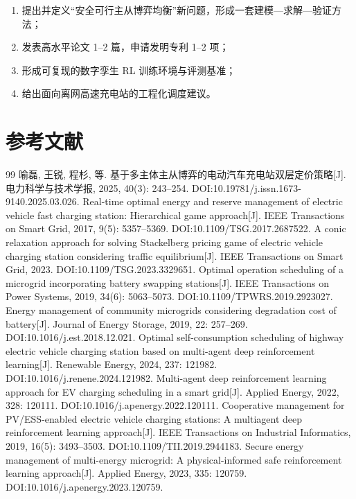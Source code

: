 \documentclass[UTF8,a4paper,11pt]{ctexart}
\begin{document}
\begin{enumerate}
  \item 提出并定义“安全可行主从博弈均衡”新问题，形成一套建模—求解—验证方法；
  \item 发表高水平论文 1--2 篇，申请发明专利 1--2 项；
  \item 形成可复现的数字孪生 RL 训练环境与评测基准；
  \item 给出面向离网高速充电站的工程化调度建议。
\end{enumerate}

\section*{参考文献}
\begin{thebibliography}{99}\small
{} 喻磊, 王锐, 程杉, 等. 基于多主体主从博弈的电动汽车充电站双层定价策略[J]. 电力科学与技术学报, 2025, 40(3): 243--254. DOI:10.19781/j.issn.1673-9140.2025.03.026.
 Real-time optimal energy and reserve management of electric vehicle fast charging station: Hierarchical game approach[J]. IEEE Transactions on Smart Grid, 2017, 9(5): 5357--5369. DOI:10.1109/TSG.2017.2687522.
 A conic relaxation approach for solving Stackelberg pricing game of electric vehicle charging station considering traffic equilibrium[J]. IEEE Transactions on Smart Grid, 2023. DOI:10.1109/TSG.2023.3329651.
 Optimal operation scheduling of a microgrid incorporating battery swapping stations[J]. IEEE Transactions on Power Systems, 2019, 34(6): 5063--5073. DOI:10.1109/TPWRS.2019.2923027.
 Energy management of community microgrids considering degradation cost of battery[J]. Journal of Energy Storage, 2019, 22: 257--269. DOI:10.1016/j.est.2018.12.021.
 Optimal self-consumption scheduling of highway electric vehicle charging station based on multi-agent deep reinforcement learning[J]. Renewable Energy, 2024, 237: 121982. DOI:10.1016/j.renene.2024.121982.
 Multi-agent deep reinforcement learning approach for EV charging scheduling in a smart grid[J]. Applied Energy, 2022, 328: 120111. DOI:10.1016/j.apenergy.2022.120111.
 Cooperative management for PV/ESS-enabled electric vehicle charging stations: A multiagent deep reinforcement learning approach[J]. IEEE Transactions on Industrial Informatics, 2019, 16(5): 3493--3503. DOI:10.1109/TII.2019.2944183.
 Secure energy management of multi-energy microgrid: A physical-informed safe reinforcement learning approach[J]. Applied Energy, 2023, 335: 120759. DOI:10.1016/j.apenergy.2023.120759.

\end{thebibliography}
\end{document}
